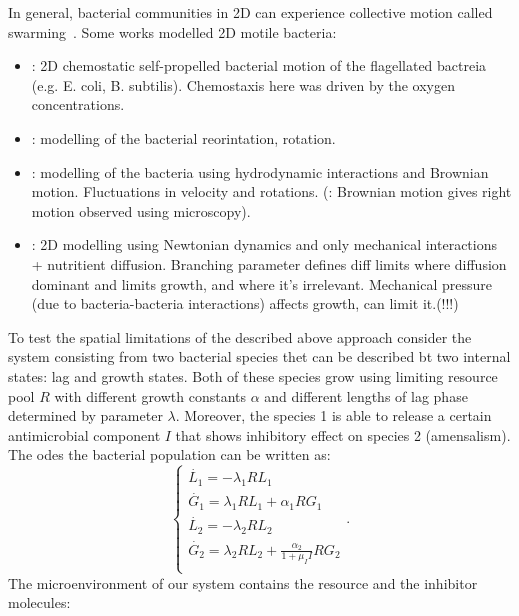\documentclass[10pt,A4paper]{article}
\begin{document}
In general, bacterial communities in 2D can experience collective motion called swarming~\cite{wu_collective_2015}.
Some works modelled 2D motile bacteria:
\begin{itemize}
    \item \cite{decoene_microscopic_2011}: 2D chemostatic self-propelled bacterial motion of the flagellated bactreia (e.g. E. coli, B. subtilis).
    Chemostaxis here was driven by the oxygen concentrations.
    \item \cite{rosser_modelling_2014}: modelling of the bacterial reorintation, rotation.
    \item \cite{sokolov_physical_2012, li_amplified_2008}: modelling of the bacteria using hydrodynamic interactions and Brownian motion.
    Fluctuations in velocity and rotations.
    (\cite{li_amplified_2008}: Brownian motion gives right motion observed using microscopy).
    \item \cite{farrell_mechanically_2013}: 2D modelling using Newtonian dynamics and only mechanical interactions + nutritient diffusion.
    Branching parameter defines diff limits where diffusion dominant and limits growth, and where it's irrelevant.
    Mechanical pressure (due to bacteria-bacteria interactions) affects growth, can limit it.(!!!)
\end{itemize}
%
To test the spatial limitations of the described above approach consider the system consisting from two bacterial species thet can be described bt two internal states: lag and growth states. 
Both of these species grow using limiting resource pool $R$ with different growth constants $\alpha$ and different lengths of lag phase determined by parameter $\lambda$.
Moreover, the species 1 is able to release a certain antimicrobial component $I$ that shows inhibitory effect on species 2 (amensalism).
The \acp{ode} the bacterial population can be written as: 
\begin{equation}
    \begin{cases}
        \dot{L_1} = -\lambda_1 R L_1\\
        \dot{G_1} = \lambda_1 R L_1 + \alpha_1 R G_1\\
        \dot{L_2} = -\lambda_2 R L_2\\
        \dot{G_2} = \lambda_2 R L_2 + \frac{\alpha_2}{1 + \mu_I I} R G_2\\
    \end{cases}.
    \label{eq:spatial_limit_F}
\end{equation}
%
The microenvironment of our system contains the resource and the inhibitor molecules:
\end{document}
